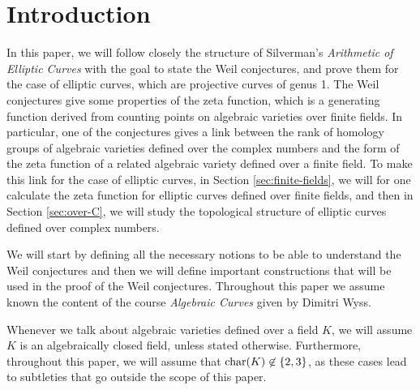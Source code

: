 \section*{Introduction}

In this paper, we will follow closely the structure of
Silverman's \emph{Arithmetic of Elliptic
Curves} \cite{silverman} with the goal to state the Weil conjectures,
and prove them for the case of elliptic curves, which are projective curves
of genus 1.
The Weil conjectures give some properties of the zeta function,
which is a generating
function derived from counting points on algebraic varieties over finite
fields.
In particular, one of the conjectures gives a link between
the rank of homology groups of algebraic varieties defined over the complex 
numbers and the form of the zeta function of a related algebraic variety
defined over a finite field. To make this link for the case of
elliptic curves, in Section \ref{sec:finite-fields}, we will for one calculate
the zeta function for elliptic curves defined over finite fields, and then
in Section \ref{sec:over-C}, we will study the topological structure of
elliptic curves defined
over complex numbers.

We will start by defining all the necessary notions to be able to understand
the Weil conjectures and then we will
define important constructions that will be used
in the proof of the Weil conjectures. 
Throughout this paper we assume known the content of the course \emph{Algebraic
Curves} given by Dimitri Wyss.

Whenever we talk about algebraic varieties defined over a field $K$, we
will assume $K$ is an algebraically closed field, unless stated otherwise.
Furthermore, throughout this paper, we will assume that
$\operatorname{char}(K) \not\in \{2, 3\}$, as these cases lead to subtleties that go outside
the scope of this paper.

